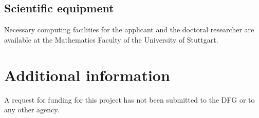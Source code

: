 \documentclass[enabledeprecatedfontcommands,cleardoublepage=empty,headsepline,twoside,11pt,DIV=15,BCOR=12mm,final]{scrartcl}
\begin{document}
\subsection{Scientific equipment}
Necessary computing facilities for the applicant and the doctoral researcher are available at the
Mathematics Faculty of the University of Stuttgart.

\section{Additional information}
\label{sec:addit-inform}

A request for funding for this project has not been submitted to the DFG or to any other
agency.
\end{document}
